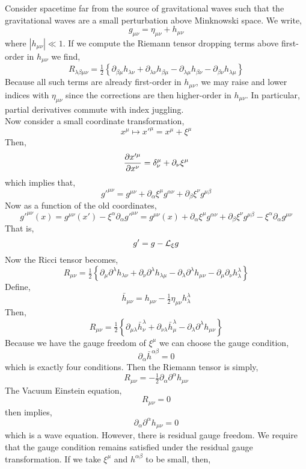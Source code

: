 \documentclass[11pt, a4paper]{article}
\begin{document}
Consider spacetime far from the source of gravitational waves such that the gravitational waves are a small perturbation above Minknowski space. We write,
\[ g_{\mu \nu} = \eta_{\mu \nu} + h_{\mu \nu} \]
where $| h_{\mu \nu} | \ll 1$. If we compute the Riemann tensor dropping terms above first-order in $h_{\mu \nu}$ we find,
\[ R_{\lambda \beta \mu \nu} =  \tfrac{1}{2} \left\{ \partial_{\beta \mu} h_{\lambda \nu} + \partial_{\lambda \nu} h_{\beta \mu} - \partial_{\lambda \mu} h_{\beta \nu} - \partial_{\beta \nu} h_{\lambda \mu} \right\} \]
Because all such terms are already first-order in $h_{\mu \nu}$, we may raise and lower indices with $\eta_{\mu \nu}$ since the corrections are then higher-order in $h_{\mu \nu}$. In particular, partial derivatives commute with index juggling. 
\bigskip\\
Now consider a small coordinate transformation,
\[ x^\mu \mapsto x'^\mu = x^\mu + \xi^\mu \]
Then,
\[ \frac{\partial{x'^\mu}}{\partial{x^\nu}} = \delta^\mu_\nu + \partial_\nu \xi^\mu \]
which implies that,
\[ g'^{\mu \nu} =  g^{\mu \nu} +  \partial_\alpha \xi^\mu g^{\alpha \nu} +  \partial_\beta \xi^\nu g^{\mu \beta}  \]
Now as a function of the old coordinates,
\[ g'^{\mu \nu}(x) = g^{\mu \nu}(x') - \xi^\alpha \partial_\alpha g'^{\mu \nu} = g^{\mu \nu}(x) +  \partial_\alpha \xi^\mu g^{\alpha \nu} +  \partial_\beta \xi^\nu g^{\mu \beta} - \xi^\alpha \partial_\alpha g^{\mu \nu} \]
That is,
\[ g' = g - \mathcal{L}_{\xi} g \]
Now the Ricci tensor becomes,
\[ R_{\mu \nu} = \tfrac{1}{2} \left\{ \partial_{\mu} \partial^\lambda h_{\lambda \nu} + \partial_\nu \partial^\lambda h_{\lambda \mu} - \partial_\lambda \partial^\lambda h_{\mu \nu} - \partial_{\mu} \partial_\nu h^\lambda_\lambda \right\} \]
Define,
\[ \bar{h}_{\mu \nu} = h_{\mu \nu} - \tfrac{1}{2} \eta_{\mu \nu} h^\lambda_\lambda \]
Then,
\[ R_{\mu \nu} = \tfrac{1}{2} \left\{ \partial_{\mu \lambda} \bar{h}^\lambda_\nu + \partial_{\nu \lambda} \bar{h}^\lambda_\mu - \partial_\lambda \partial^\lambda h_{\mu \nu} \right\} \]
Because we have the gauge freedom of $\xi^\mu$ we can choose the gauge condition,
\[ \partial_\alpha \bar{h}^{\alpha \beta} = 0 \]
which is exactly four conditions. Then the Riemann tensor is simply,
\[ R_{\mu \nu} = - \tfrac{1}{2} \partial_\alpha \partial^\alpha h_{\mu \nu} \] 
The Vacuum Einstein equation,
\[ R_{\mu \nu} = 0 \]
then implies,
\[ \partial_\alpha \partial^\alpha h_{\mu \nu} = 0 \]
which is a wave equation. However, there is residual gauge freedom. We require that the gauge condition remains satisfied under the residual gauge transformation. If we take $\xi^\mu$ and $h^{\alpha \beta}$ to be small, then,
\end{document}

